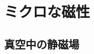 \documentclass{report}
\begin{document}
  \maketitle
  \tableofcontents
  \chapter{ミクロな磁性}
  \section{真空中の静磁場}
    
\end{document}
